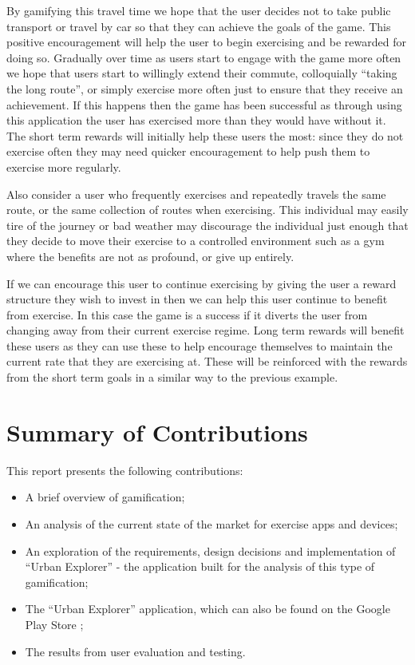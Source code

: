 By gamifying this travel time we hope that the user decides not to
take public transport or travel by car so that they can achieve the
goals of the game. This positive encouragement will help the user to
begin exercising and be rewarded for doing so. Gradually over time as
users start to engage with the game more often we hope that users
start to willingly extend their commute, colloquially ``taking the
long route'', or simply exercise more often just to ensure that they
receive an achievement. If this happens then the game has been
successful as through using this application the user has exercised
more than they would have without it. The short term rewards will
initially help these users the most: since they do not exercise
often they may need quicker encouragement to help push them to
exercise more regularly.

Also consider a user who frequently exercises and repeatedly travels
the same route, or the same collection of routes when exercising. This
individual may easily tire of the journey or bad weather may
discourage the individual just enough that they decide to move their
exercise to a controlled environment such as a gym where the benefits
are not as profound, or give up entirely. 

If we can encourage this user to continue exercising by giving the
user a reward structure they wish to invest in then we can help this
user continue to benefit from exercise. In this case the game is a
success if it diverts the user from changing away from their current
exercise regime. Long term rewards will benefit these users as they
can use these to help encourage themselves to maintain the current
rate that they are exercising at. These will be reinforced with the
rewards from the short term goals in a similar way to the previous
example. 

\section{Summary of Contributions}

This report presents the following contributions: 

\begin{itemize}
  \item A brief overview of gamification;
  \item An analysis of the current state of the market for exercise
    apps and devices;
  \item An exploration of the requirements, design decisions and
    implementation of ``Urban Explorer'' - the application built for
    the analysis of this type of gamification;
  \item The ``Urban Explorer'' application, which can also be found on
    the Google Play Store \cite{app_store_link};
  \item The results from user evaluation and testing.
\end{itemize}

